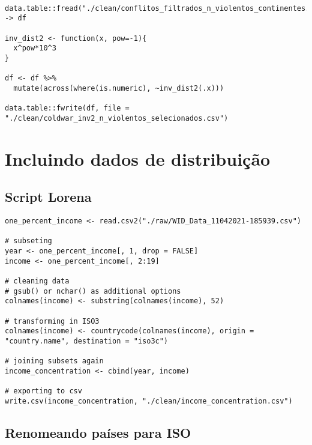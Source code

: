 \documentclass[11pt]{article}
\begin{document}
\begin{verbatim}

data.table::fread("./clean/conflitos_filtrados_n_violentos_continentes.csv") -> df

inv_dist2 <- function(x, pow=-1){
  x^pow*10^3
}

df <- df %>%
  mutate(across(where(is.numeric), ~inv_dist2(.x)))

data.table::fwrite(df, file = "./clean/coldwar_inv2_n_violentos_selecionados.csv")
\end{verbatim}

\section*{Incluindo dados de distribuição}
\label{sec:org116642f}

\subsection*{Script Lorena}
\label{sec:org3ac47a1}

\begin{verbatim}
one_percent_income <- read.csv2("./raw/WID_Data_11042021-185939.csv")

# subseting
year <- one_percent_income[, 1, drop = FALSE]
income <- one_percent_income[, 2:19]

# cleaning data
# gsub() or nchar() as additional options
colnames(income) <- substring(colnames(income), 52)

# transforming in ISO3
colnames(income) <- countrycode(colnames(income), origin = "country.name", destination = "iso3c")

# joining subsets again
income_concentration <- cbind(year, income)

# exporting to csv
write.csv(income_concentration, "./clean/income_concentration.csv")
\end{verbatim}


\subsection*{Renomeando países para ISO}
\label{sec:orgb5c50ff}
\end{document}
